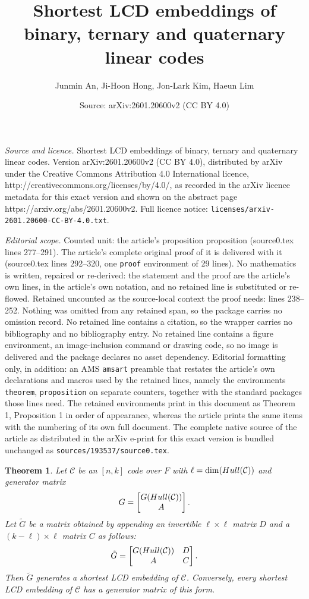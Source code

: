 \documentclass[10pt,a4paper]{amsart}
\title{Shortest LCD embeddings of binary, ternary and quaternary linear codes}
\author{Junmin An, Ji-Hoon Hong, Jon-Lark Kim, Haeun Lim}
\date{Source: arXiv:2601.20600v2 (CC BY 4.0)}
\newtheorem{theorem}{Theorem}
\begin{document}
\maketitle

\noindent\emph{Source and licence.} Shortest LCD embeddings of binary, ternary and quaternary linear codes. Version arXiv:2601.20600v2 (CC BY 4.0), distributed by arXiv under the Creative Commons Attribution 4.0 International licence, http://creativecommons.org/licenses/by/4.0/, as recorded in the arXiv licence metadata for this exact version and shown on the abstract page https://arxiv.org/abs/2601.20600v2. Full licence notice: \texttt{licenses/arxiv-2601.20600-CC-BY-4.0.txt}.\par\smallskip

\noindent\textit{Editorial scope.} Counted unit: the article's proposition proposition (source0.tex lines 277--291). The article's complete original proof of it is delivered with it (source0.tex lines 292--320, one \texttt{proof} environment of 29 lines). No mathematics is written, repaired or re-derived: the statement and the proof are the article's own lines, in the article's own notation, and no retained line is substituted or re-flowed.  Retained uncounted as the source-local context the proof needs: lines 238--252.  Nothing was omitted from any retained span, so the package carries no omission record.  No retained line contains a citation, so the wrapper carries no bibliography and no bibliography entry.  No retained line contains a figure environment, an image-inclusion command or drawing code, so no image is delivered and the package declares no asset dependency.  Editorial formatting only, in addition: an AMS \texttt{amsart} preamble that restates the article's own declarations and macros used by the retained lines, namely the environments \texttt{theorem}, \texttt{proposition} on separate counters, together with the standard packages those lines need.  The retained environments print in this document as Theorem 1, Proposition 1 in order of appearance, whereas the article prints the same items with the numbering of its own full document.  The complete native source of the article as distributed in the arXiv e-print for this exact version is bundled unchanged as \texttt{sources/193537/source0.tex}.
\begin{theorem}\label{construct-LCD}
    Let $\mathcal{C}$ be an $[n, k]$ code over $F$ with $\ell=\dim({\rm Hull}(\mathcal{C}))$ and generator matrix
    \[
    G=\begin{bmatrix}
    G({\rm Hull}(\mathcal{C}))\\A
    \end{bmatrix}.
    \]
    Let $\tilde{G}$ be a matrix obtained by appending an invertible $\ell\times \ell$ matrix $D$ and a $(k-\ell)\times \ell$ matrix $C$ as follows:
    \[
    \tilde{G}=\begin{bmatrix}
        G({\rm Hull}(\mathcal{C})) & D\\A & C
    \end{bmatrix}.
    \]
    Then $\tilde{G}$ generates a shortest LCD embedding of $\mathcal{C}$. Conversely, every shortest LCD embedding of $\mathcal{C}$ has a generator matrix of this form.
\end{theorem}
\end{document}
